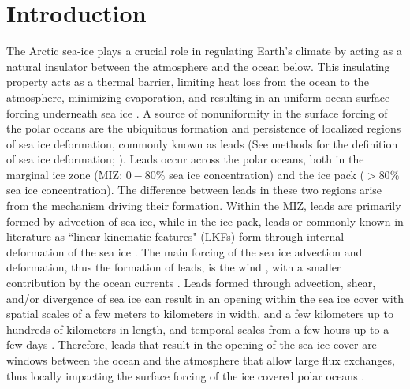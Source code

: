 \documentclass[lineno,sn-basic]{sn-jnl}%
\begin{document}



\maketitle

\section{Introduction}\label{sec1}

The Arctic sea-ice plays a crucial role in regulating Earth's climate by acting as a natural insulator between the atmosphere and the ocean below. This insulating property acts as a thermal barrier, limiting heat loss from the ocean to the atmosphere, minimizing evaporation, and resulting in an uniform ocean surface forcing underneath sea ice \citep{Wettlaufer_insulator_1997, Untersteiner_ice_insulator_1961}. A source of nonuniformity in the surface forcing of the polar oceans are the ubiquitous formation and persistence of localized regions of sea ice deformation, commonly known as leads (See methods for the definition of sea ice deformation; \citealp{Hutter_identification_2019, Ruffieux_pack_lead_1995}). Leads occur across the polar oceans, both in the marginal ice zone (MIZ; $0-80\%$ sea ice concentration) and the ice pack ($>80\%$ sea ice concentration). The difference between leads in these two regions arise from the mechanism driving their formation. Within the MIZ, leads are primarily formed by advection of sea ice, while in the ice pack, leads or commonly known in literature as ``linear kinematic features" (LKFs) form through internal deformation of the sea ice \citep{kwok_deformation_2001}. 
The main forcing of the sea ice advection and deformation, thus the formation of leads, is the wind \citep{Linow_lkf_2017, Hutter_scaling_lkf_2018}, with a smaller contribution by the ocean currents \citep{Willmes_leads_currents_2023}.
Leads formed through advection, shear, and/or divergence of sea ice can result in an opening within the sea ice cover \citep{Rampal_nextsim_2016, Hutchings_model_lkf_2005, Richter_pack_stress_2002} with spatial scales of a few meters to kilometers in width, and a few kilometers up to hundreds of kilometers in length, and temporal scales from a few hours up to a few days \citep{Linow_lkf_2017, Wernecke_Lead_2015, Tschudi_obs_leads_1998}. Therefore, leads that result in the opening of the sea ice cover are windows between the ocean and the atmosphere that allow large flux exchanges, thus locally impacting the surface forcing of the ice covered polar oceans \citep{Lupkes_leads_2008}. 
\end{document}
